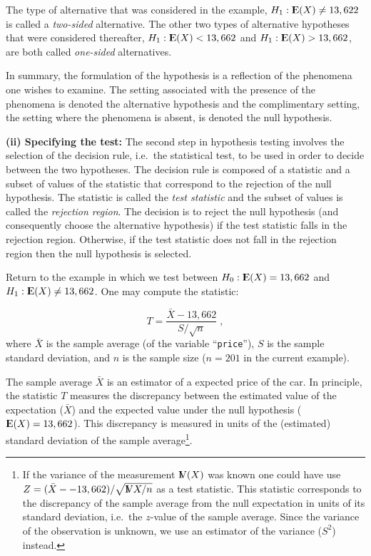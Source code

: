 \documentclass[]{krantz}
\newcommand{\Expec}{{\rm I\kern-.3em E}}
\newcommand{\Var}{{\rm I\kern-.3em V}}
\theoremstyle{definition}
\theoremstyle{definition}
\theoremstyle{definition}
\theoremstyle{remark}
\begin{document}
The type of alternative that was considered in the example,
\(H_1: \Expec(X) \not = 13,622\) is called a \emph{two-sided} alternative. The
other two types of alternative hypotheses that were considered
thereafter, \(H_1: \Expec(X) < 13,662\) and \(H_1: \Expec(X) > 13,662\), are
both called \emph{one-sided} alternatives.

In summary, the formulation of the hypothesis is a reflection of the
phenomena one wishes to examine. The setting associated with the
presence of the phenomena is denoted the alternative hypothesis and the
complimentary setting, the setting where the phenomena is absent, is
denoted the null hypothesis.

{\textbf{(ii) Specifying the test:}} The second step in hypothesis testing
involves the selection of the decision rule, i.e.~the statistical test,
to be used in order to decide between the two hypotheses. The decision
rule is composed of a statistic and a subset of values of the statistic
that correspond to the rejection of the null hypothesis. The statistic
is called the \emph{test statistic} and the subset of values is called the
\emph{rejection region}. The decision is to reject the null hypothesis (and
consequently choose the alternative hypothesis) if the test statistic
falls in the rejection region. Otherwise, if the test statistic does not
fall in the rejection region then the null hypothesis is selected.

Return to the example in which we test between \(H_0:\Expec(X) = 13,662\)
and \(H_1:\Expec(X) \not= 13,662\). One may compute the statistic:

\[T = \frac{\bar X - 13,662}{S/\sqrt{n}}\;,\] where \(\bar X\) is the
sample average (of the variable ``\texttt{price}''), \(S\) is the sample standard
deviation, and \(n\) is the sample size (\(n = 201\) in the current
example).

The sample average \(\bar X\) is an estimator of a expected price of the
car. In principle, the statistic \(T\) measures the discrepancy between
the estimated value of the expectation (\(\bar X\)) and the expected value
under the null hypothesis (\(\Expec(X) = 13,662\)). This discrepancy is
measured in units of the (estimated) standard deviation of the sample
average\footnote{If the variance of the measurement \(\Var(X)\) was known one could
  have use \(Z = (\bar X- - 13,662)/\sqrt{\Var{X}/n}\) as a test
  statistic. This statistic corresponds to the discrepancy of the
  sample average from the null expectation in units of its standard
  deviation, i.e.~the \(z\)-value of the sample average. Since the
  variance of the observation is unknown, we use an estimator of the
  variance (\(S^2\)) instead.}.
\end{document}

